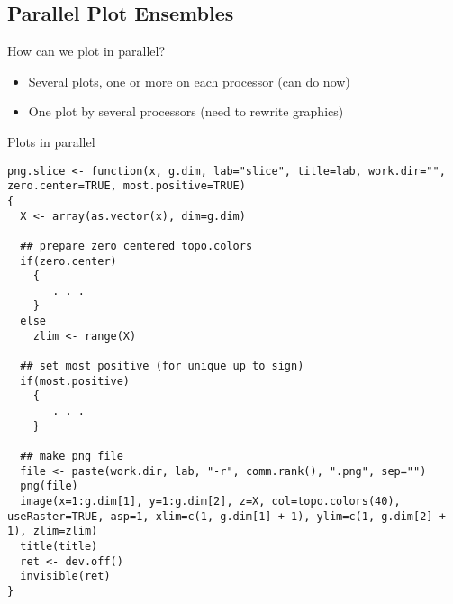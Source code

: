 \subsection{Parallel Plot Ensembles}

\begin{frame}
  \begin{block}{How can we plot in parallel?}\pause
  \begin{itemize}
    \item Several plots, one or more on each processor (can do now)
    \item One plot by several processors (need to rewrite graphics)
  \end{itemize}
  \end{block}
\end{frame}

\begin{frame}
  \begin{exampleblock}{Plots in parallel}\pause
\begin{lstlisting}[title=png.slice]
png.slice <- function(x, g.dim, lab="slice", title=lab, work.dir="", zero.center=TRUE, most.positive=TRUE)
{
  X <- array(as.vector(x), dim=g.dim)

  ## prepare zero centered topo.colors
  if(zero.center)
    {
       . . .
    }
  else
    zlim <- range(X)

  ## set most positive (for unique up to sign)
  if(most.positive)
    {
       . . .
    }
  
  ## make png file
  file <- paste(work.dir, lab, "-r", comm.rank(), ".png", sep="")
  png(file)
  image(x=1:g.dim[1], y=1:g.dim[2], z=X, col=topo.colors(40), useRaster=TRUE, asp=1, xlim=c(1, g.dim[1] + 1), ylim=c(1, g.dim[2] + 1), zlim=zlim)
  title(title)
  ret <- dev.off()
  invisible(ret)
}
\end{lstlisting}
  \end{exampleblock}
\end{frame}


